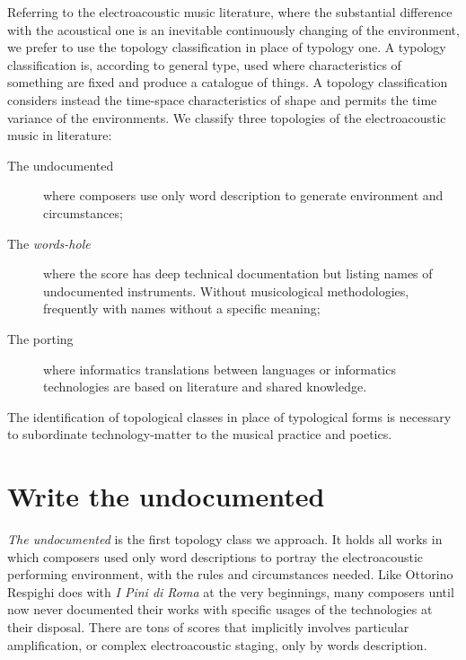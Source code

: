 \documentclass[twoside,a4paper]{article}
\begin{document}
Referring to the electroacoustic music literature, where the substantial difference with the acoustical one is an inevitable continuously changing of the environment, we prefer to use the topology classification in place of typology one. A typology classification is, according to general type, used where characteristics of something are fixed and produce a catalogue of things. A topology classification considers instead the time-space characteristics of shape and permits the time variance of the environments. We classify three topologies of the electroacoustic music in literature:

\begin{description}
  \item[The undocumented] where composers use only word description to generate environment and circumstances;
  \item[The \emph{words-hole}] where the score has deep technical documentation but listing names of undocumented instruments. Without musicological methodologies, frequently with names without a specific meaning;
  \item[The porting] where informatics translations between languages or informatics technologies are based on literature and shared knowledge.
\end{description}

The identification of topological classes in place of typological forms is necessary to subordinate technology-matter to the musical practice and poetics. %


\section{Write the undocumented}
\label{sec:writing}

\emph{The undocumented} is the first topology class we approach. It holds all works in which composers used only word descriptions to portray the electroacoustic performing environment, with the rules and circumstances needed. Like Ottorino Respighi does with \emph{I Pini di Roma} \cite{ropr25} at the very beginnings, many composers until now never documented their works with specific usages of the technologies at their disposal. There are tons of scores that implicitly involves particular amplification, or complex electroacoustic staging, only by words description.
\end{document}
